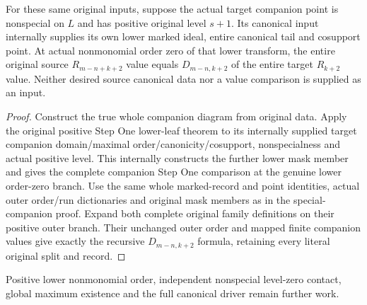 \begin{theorem}
\label{hir:smooth-original-general-positive-companion-leaf}
\leanok
{}
For these same original inputs, suppose the actual target companion point
is nonspecial on $L$ and has positive original level $s+1$.  Its canonical
input internally supplies its own lower marked ideal, entire canonical
tail and cosupport point.  At actual nonmonomial order zero of that lower
transform, the entire original source $R_{m-n+k+2}$ value equals
$D_{m-n,k+2}$ of the entire target $R_{k+2}$ value.  Neither desired source
canonical data nor a value comparison is supplied as an input.
\end{theorem}
\begin{proof}
Construct the true whole companion diagram from original data.  Apply the
original positive Step One lower-leaf theorem to its internally supplied
target companion domain/maximal order/canonicity/cosupport, nonspecialness
and actual positive level.  This internally constructs the further lower
mask member and gives the complete companion Step One comparison at the
genuine lower order-zero branch.  Use the same whole marked-record and
point identities, actual outer order/run dictionaries and original mask
members as in the special-companion proof.  Expand both complete original
family definitions on their positive outer branch.  Their unchanged outer
order and mapped finite companion values give exactly the recursive
$D_{m-n,k+2}$ formula, retaining every literal original split and record.
\end{proof}

Positive lower nonmonomial order, independent nonspecial level-zero contact,
global maximum existence and the full canonical driver remain further work.

